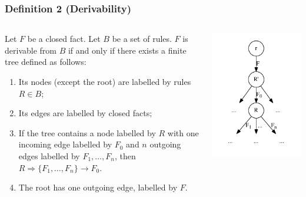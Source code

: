 \documentclass[10pt]{beamer}
\begin{document}
\begin{frame}
  \frametitle{Definition 2 (Derivability)}

  \begin{columns}
    \begin{column}{.6\textwidth}
      Let $F$ be a closed fact.
      Let $B$ be a set of rules.
      $F$ is derivable from $B$ if and only if there exists a finite tree defined as follows:
      \begin{enumerate}
        \item Its nodes (except the root) are labelled by rules $R \in B$;
        \item Its edges are labelled by closed facts;
        \item If the tree contains a node labelled by $R$ with one incoming edge labelled by $F_0$ and $n$ outgoing edges labelled by $F_1, \dots, F_n$, then $R \Rightarrow \{F_1, \dots, F_n\} \rightarrow F_0$.
        \item The root has one outgoing edge, labelled by $F$.
      \end{enumerate}
    \end{column}
    \begin{column}{.4\textwidth}
      \includegraphics[width=\textwidth]{derivation_tree}
    \end{column}
  \end{columns}
\end{frame}
\end{document}
